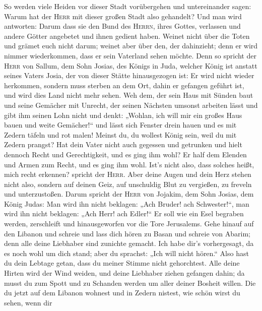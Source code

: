  So werden viele Heiden vor dieser Stadt vorübergehen und
untereinander sagen: Warum hat der \textsc{Herr} mit dieser großen Stadt
also gehandelt?  Und man wird antworten: Darum dass sie
den Bund des \textsc{Herrn}, ihres Gottes, verlassen und andere Götter
angebetet und ihnen gedient haben.  Weinet nicht über die
Toten und grämet euch nicht darum; weinet aber über den, der dahinzieht;
denn er wird nimmer wiederkommen, dass er sein Vaterland sehen möchte.
 Denn so spricht der \textsc{Herr} von Sallum, dem Sohn
Josias, des Königs in Juda, welcher König ist anstatt seines Vaters
Josia, der von dieser Stätte hinausgezogen ist: Er wird nicht wieder
herkommen,  sondern muss sterben an dem Ort, dahin er
gefangen geführt ist, und wird dies Land nicht mehr sehen.
 Weh dem, der sein Haus mit Sünden baut und seine
Gemächer mit Unrecht, der seinen Nächsten umsonst arbeiten lässt und
gibt ihm seinen Lohn nicht  und denkt: „Wohlan, ich will
mir ein großes Haus bauen und weite Gemächer!{}`` und lässt sich Fenster
drein hauen und es mit Zedern täfeln und rot malen! 
Meinst du, du wollest König sein, weil du mit Zedern prangst? Hat dein
Vater nicht auch gegessen und getrunken und hielt dennoch Recht und
Gerechtigkeit, und es ging ihm wohl?  Er half dem Elenden
und Armen zum Recht, und es ging ihm wohl. Ist's nicht also, dass
solches heißt, mich recht erkennen? spricht der \textsc{Herr}.
 Aber deine Augen und dein Herz stehen nicht also,
sondern auf deinen Geiz, auf unschuldig Blut zu vergießen, zu freveln
und unterzustoßen.  Darum spricht der \textsc{Herr} von
Jojakim, dem Sohn Josias, dem König Judas: Man wird ihn nicht beklagen:
„Ach Bruder! ach Schwester!{}``, man wird ihn nicht beklagen: „Ach Herr!
ach Edler!{}``  Er soll wie ein Esel begraben werden,
zerschleift und hinausgeworfen vor die Tore Jerusalems. 
Gehe hinauf auf den Libanon und schreie und lass dich hören zu Basan und
schreie von Abarim; denn alle deine Liebhaber sind zunichte gemacht.
 Ich habe dir's vorhergesagt, da es noch wohl um dich
stand; aber du sprachst: „Ich will nicht hören.`` Also hast du dein
Lebtage getan, dass du meiner Stimme nicht gehorchtest. 
Alle deine Hirten wird der Wind weiden, und deine Liebhaber ziehen
gefangen dahin; da musst du zum Spott und zu Schanden werden um aller
deiner Bosheit willen.  Die du jetzt auf dem Libanon
wohnest und in Zedern nistest, wie schön wirst du sehen, wenn dir
